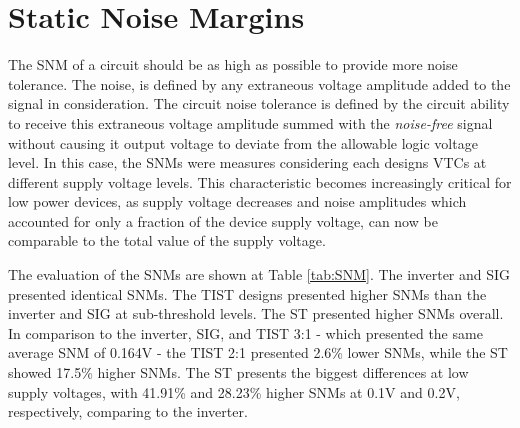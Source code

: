 \documentclass[pgmicro,diss,english]{iiufrgs}
\begin{document}

\section{Static Noise Margins}

	The SNM of a circuit should be as high as possible to provide more noise tolerance. The noise, is defined by any extraneous voltage amplitude added to the signal in consideration. The circuit noise tolerance is defined by the circuit ability to receive this extraneous voltage amplitude summed with the \textit{noise-free} signal without causing it output voltage to deviate from the allowable logic voltage level. In this case, the SNMs were measures considering each designs VTCs at different supply voltage levels. This characteristic becomes increasingly critical for low power devices, as supply voltage decreases and noise amplitudes which accounted for only a fraction of the device supply voltage, can now be comparable to the total value of the supply voltage.

	The evaluation of the SNMs are shown at Table \ref{tab:SNM}. The inverter and SIG presented identical SNMs. The TIST designs presented higher SNMs than the inverter and SIG at sub-threshold levels. The ST presented higher SNMs overall. In comparison to the inverter, SIG, and TIST 3:1 - which presented the same average SNM of 0.164V - the TIST 2:1 presented 2.6\% lower SNMs, while the ST showed 17.5\% higher SNMs. The ST presents the biggest differences at low supply voltages, with 41.91\% and 28.23\% higher SNMs at 0.1V and 0.2V, respectively, comparing to the inverter.
\end{document}
